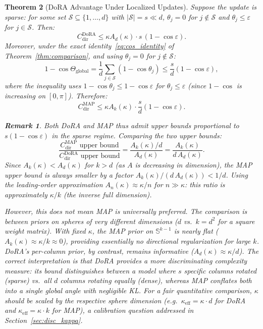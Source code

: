 \documentclass[11pt]{article}
\newtheorem{theorem}{Theorem}[section]
\newtheorem{remark}[theorem]{Remark}
\newcommand{\Ad}{A_d}
\newcommand{\Ak}{A_k}
\begin{document}
\begin{theorem}[DoRA Advantage Under Localized Updates]
\label{thm:dora_advantage}
Suppose the update is sparse: for some set $\mathcal{S} \subseteq \{1,\ldots,d\}$
with $|\mathcal{S}| = s \ll d$, $\theta_j = 0$ for $j \notin \mathcal{S}$ and
$\theta_j \leq \varepsilon$ for $j \in \mathcal{S}$.
Then:
\[
  C^{\mathrm{DoRA}}_{\mathrm{dir}} \leq \kappa \Ad(\kappa) \cdot s\,(1 - \cos\varepsilon).
\]
Moreover, under the exact identity~\eqref{eq:cos_identity} of
Theorem~\ref{thm:comparison}, and using $\theta_j = 0$ for $j \notin
\mathcal{S}$:
\begin{equation}
  1 - \cos\Theta_{\mathrm{global}}
  = \frac{1}{d}\sum_{j \in \mathcal{S}} (1-\cos\theta_j)
  \leq \frac{s}{d}(1 - \cos\varepsilon),
\label{eq:global_upper}
\end{equation}
where the inequality uses $1-\cos\theta_j \leq 1-\cos\varepsilon$ for
$\theta_j \leq \varepsilon$ (since $1-\cos$ is increasing on $[0,\pi]$).
Therefore:
\[
  C^{\mathrm{MAP}}_{\mathrm{dir}} \leq \kappa \Ak(\kappa)\cdot\frac{s}{d}(1 - \cos\varepsilon).
\]
\begin{remark}
Both DoRA and MAP thus admit \emph{upper} bounds proportional to $s(1-\cos\varepsilon)$
in the sparse regime.
Comparing the two upper bounds:
\[
  \frac{C^{\mathrm{MAP}}_{\mathrm{dir}}\text{ upper bound}}
       {C^{\mathrm{DoRA}}_{\mathrm{dir}}\text{ upper bound}}
  = \frac{\Ak(\kappa)/d}{\Ad(\kappa)}
  = \frac{\Ak(\kappa)}{d\,\Ad(\kappa)}.
\]
Since $\Ak(\kappa) < \Ad(\kappa)$ for $k > d$ (as $A$ is decreasing in dimension),
the MAP upper bound is always smaller by a factor $\Ak(\kappa)/(d\,\Ad(\kappa)) < 1/d$.
Using the leading-order approximation $A_n(\kappa) \approx \kappa/n$ for $n \gg \kappa$:
this ratio is approximately $\kappa/k$ (the inverse full dimension).

However, this does \emph{not} mean MAP is universally preferred.
The comparison is between priors on spheres of very different dimensions ($d$
vs.\ $k = d^2$ for a square weight matrix).
With fixed $\kappa$, the MAP prior on $\mathbb{S}^{k-1}$ is nearly flat
($\Ak(\kappa) \approx \kappa/k \approx 0$), providing essentially no
directional regularization for large $k$.
DoRA's per-column prior, by contrast, remains informative ($\Ad(\kappa) \approx
\kappa/d$).
The correct interpretation is that DoRA provides a \emph{more discriminating}
complexity measure: its bound distinguishes between a model where $s$ specific
columns rotated (sparse) vs.\ all $d$ columns rotating equally (dense),
whereas MAP conflates both into a single global angle with negligible KL.
For a fair quantitative comparison, $\kappa$ should be scaled by the
respective sphere dimension (e.g.\ $\kappa_{\mathrm{eff}} = \kappa \cdot d$ for
DoRA and $\kappa_{\mathrm{eff}} = \kappa \cdot k$ for MAP), a calibration
question addressed in Section~\ref{sec:disc_kappa}.
\end{remark}
\end{theorem}
\end{document}
